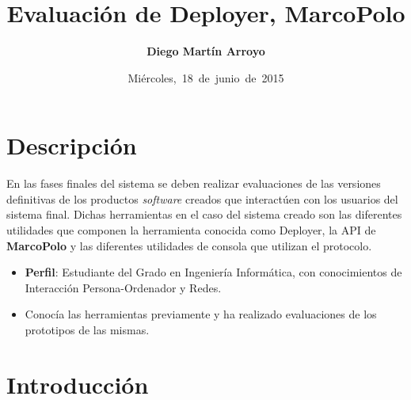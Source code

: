 
\usepackage{xcolor}

\newcommand{\hmwkTitle}{Evaluación de Deployer, MarcoPolo } %
\newcommand{\hmwkDueDate}{Miércoles,\ 18\ de\ junio\ de\ 2015}
\newcommand{\hmwkClassInstructor}{Rodrigo Santamaría} %
\newcommand{\hmwkAuthorName}{Diego Martín Arroyo} %
\newcommand{\hmwkSubject}{3} %

\newcommand{\ordinalindicator}{\hspace{-1.5mm}$\phantom{a}^{\circ}$}
\title{\hmwkTitle}
\author{\textbf{\hmwkAuthorName}}
\date{\hmwkDueDate}


\maketitle

\tableofcontents

\section{Descripción}

En las fases finales del sistema se deben realizar evaluaciones de las versiones definitivas de los productos \textit{software} creados que interactúen con los usuarios del sistema final. Dichas herramientas en el caso del sistema creado son las diferentes utilidades que componen la herramienta conocida como Deployer, la API de \textbf{MarcoPolo} y las diferentes utilidades de consola que utilizan el protocolo.

\begin{itemize}
 	\item \textbf{Perfil}: Estudiante del Grado en Ingeniería Informática, con conocimientos de Interacción Persona-Ordenador y Redes.
 	\item Conocía las herramientas previamente y ha realizado evaluaciones de los prototipos de las mismas.
\end{itemize}

\section{Introducción}

